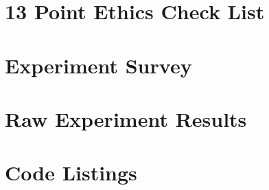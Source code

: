 \documentclass[11pt,openright,twoside,a4paper]{report}
\begin{document}
\chapter{13 Point Ethics Check List}
\label{ch:appendix-ethics-checklist}


\chapter{Experiment Survey}
\label{ch:appendix-experiment-survey}


\chapter{Raw Experiment Results}
\label{ch:appendix-survey-results}


\chapter{Code Listings}
\label{ch:appendix-code-listings}

\end{document}
